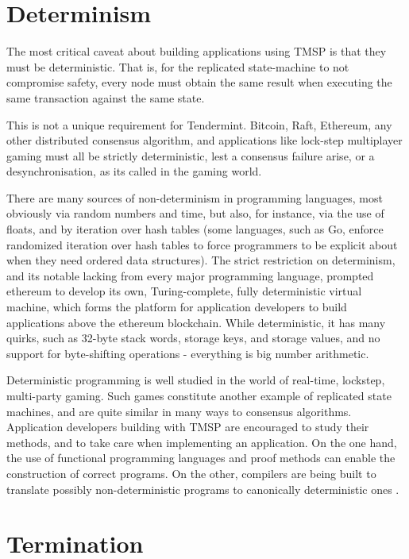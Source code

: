 \section{Determinism}

The most critical caveat about building applications using TMSP is that they must be deterministic.
That is, for the replicated state-machine to not compromise safety, 
every node must obtain the same result when executing the same transaction against the same state.

This is not a unique requirement for Tendermint. Bitcoin, Raft, Ethereum, any other distributed consensus algorithm,
and applications like lock-step multiplayer gaming must all be strictly deterministic, lest a consensus failure arise,
or a desynchronisation, as its called in the gaming world.

There are many sources of non-determinism in programming languages, most obviously via random numbers and time,
but also, for instance, via the use of floats, and by iteration over hash tables 
(some languages, such as Go, enforce randomized iteration over hash tables to force programmers to be explicit about when they need ordered data structures).
The strict restriction on determinism, and its notable lacking from every major programming language,
prompted ethereum to develop its own, Turing-complete, fully deterministic virtual machine,
which forms the platform for application developers to build applications above the ethereum blockchain.
While deterministic, it has many quirks, such as 32-byte stack words, storage keys, and storage values,
and no support for byte-shifting operations - everything is big number arithmetic.

Deterministic programming is well studied in the world of real-time, lockstep, multi-party gaming.
Such games constitute another example of replicated state machines, and are quite similar in many ways to consensus algorithms.
Application developers building with TMSP are encouraged to study their methods, and to take care when implementing an application.
On the one hand, the use of functional programming languages and proof methods can enable the construction of correct programs.
On the other, compilers are being built to translate possibly non-deterministic programs to canonically deterministic ones \cite{deterministicjs}.

\section{Termination}

